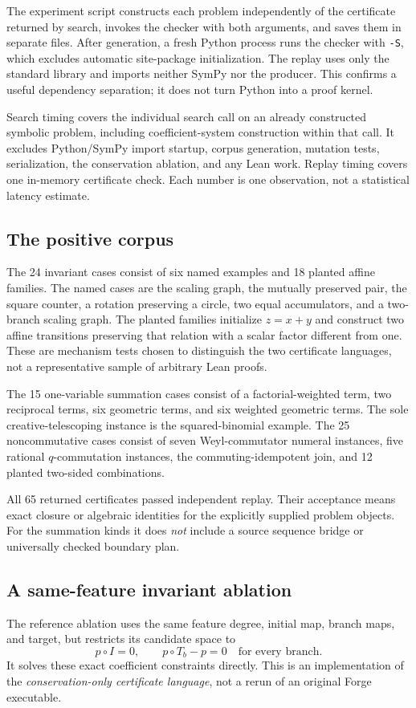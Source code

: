 \documentclass[11pt,letterpaper]{article}
\newcommand{\code}[1]{\texttt{#1}}
\theoremstyle{definition}\newtheorem{definition}[theorem]{Definition}
\theoremstyle{remark}\newtheorem{remark}[theorem]{Remark}
\begin{document}
The experiment script constructs each problem independently of the certificate
returned by search, invokes the checker with both arguments, and saves them in
separate files. After generation, a fresh Python process runs the checker with
\code{-S}, which excludes automatic site-package initialization. The replay
uses only the standard library and imports neither SymPy nor the producer.
This confirms a useful dependency separation; it does not turn Python into a
proof kernel.

Search timing covers the individual search call on an already constructed
symbolic problem, including coefficient-system construction within that call.
It excludes Python/SymPy import startup, corpus generation, mutation tests,
serialization, the conservation ablation, and any Lean work. Replay timing
covers one in-memory certificate check. Each number is one observation, not a
statistical latency estimate.



\subsection{The positive corpus}
The 24 invariant cases consist of six named examples and 18 planted affine
families. The named cases are the scaling graph, the mutually preserved pair,
the square counter, a rotation preserving a circle, two equal accumulators,
and a two-branch scaling graph. The planted families initialize $z=x+y$ and
construct two affine transitions preserving that relation with a scalar factor
different from one. These are mechanism tests chosen to distinguish the two
certificate languages, not a representative sample of arbitrary Lean proofs.

The 15 one-variable summation cases consist of a factorial-weighted term, two
reciprocal terms, six geometric terms, and six weighted geometric terms.
The sole creative-telescoping instance is the squared-binomial example. The
25 noncommutative cases consist of seven Weyl-commutator numeral instances,
five rational $q$-commutation instances, the commuting-idempotent join, and
12 planted two-sided combinations.

All 65 returned certificates passed independent replay. Their acceptance means
exact closure or algebraic identities for the explicitly supplied problem
objects. For the summation kinds it does \emph{not} include a source sequence
bridge or universally checked boundary plan.

\subsection{A same-feature invariant ablation}
The reference ablation uses the same feature degree, initial map, branch maps,
and target, but restricts its candidate space to
\[
 p\circ I=0,\qquad p\circ T_b-p=0\quad\text{for every branch}.
\]
It solves these exact coefficient constraints directly. This is an
implementation of the \emph{conservation-only certificate language}, not a
rerun of an original Forge executable.
\end{document}

